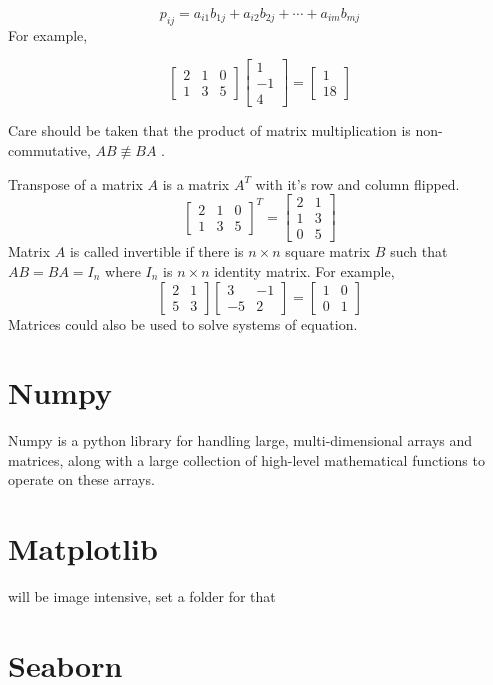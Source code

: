 \begin{equation}
	p_{ij}=a_{i1}b_{1j}+a_{i2}b_{2j}+\cdots+a_{im}b_{mj}
\end{equation}
\noindent For example,

\begin{equation}
	\begin{bmatrix}
		2&1  &0  \\
		1& 3 &5
	\end{bmatrix}
	\begin{bmatrix}
		1 \\
		-1 \\
		4
	\end{bmatrix}=
	\begin{bmatrix}
		1 \\
		18
	\end{bmatrix}
\end{equation}

\noindent Care should be taken that the product of matrix multiplication is non-commutative, $AB\not\equiv BA$ .

\noindent Transpose of a matrix $A$ is a matrix $A^T$ with it's row and column flipped.
\begin{equation}
\begin{bmatrix}
	2&1  &0  \\
	1& 3 &5 
\end{bmatrix}^T=
\begin{bmatrix}
	2& 1 \\
	1& 3 \\
	0&5
\end{bmatrix}
\end{equation}
\noindent Matrix $A$ is called invertible if there is $n\times n$ square matrix $B$ such that $AB=BA=I_n$ where $I_n$ is $n\times n$ identity matrix. For example,
\begin{equation}
	\begin{bmatrix}
		2&1   \\
		5& 3 
	\end{bmatrix}
	\begin{bmatrix}
		3& -1 \\
		-5& 2 
	\end{bmatrix}=
	\begin{bmatrix}
		1& 0 \\
		0& 1 
	\end{bmatrix}
\end{equation}
\noindent Matrices could also be used to solve systems of equation.

\section{Numpy}
Numpy is a python library for handling large, multi-dimensional arrays and matrices, along with a large collection of high-level mathematical functions to operate on these arrays.
\section{Matplotlib}
will be image intensive, set a folder for that
\section{Seaborn}